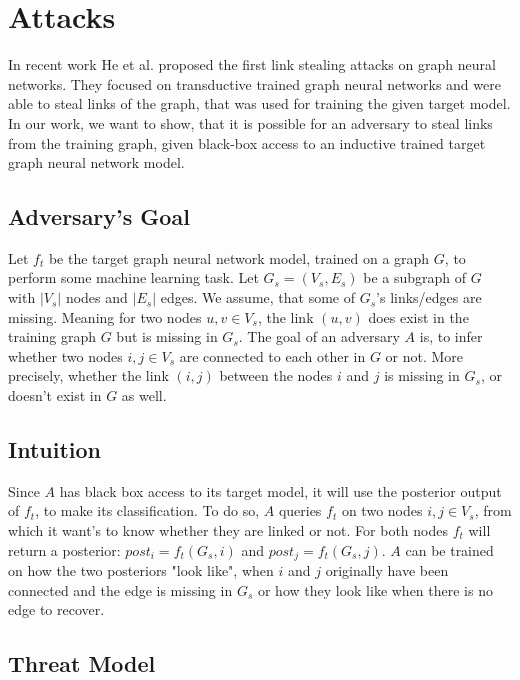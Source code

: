 \chapter{Attacks}
\label{chapter:attacks}

  In recent work He et al. \cite{DBLP:journals/corr/abs-2005-02131} proposed the first link stealing attacks on graph neural networks.
  They focused on transductive trained graph neural networks and were able to steal links of the graph, that was used for training the given target model.
  In our work, we want to show, that it is possible for an adversary to steal links from the training graph, given black-box access to an inductive trained target graph neural network model.

  \section{Adversary's Goal}

    Let $f_t$ be the target graph neural network model, trained on a graph $G$, to perform some machine learning task.
    Let $G_s = (V_s, E_s)$ be a subgraph of $G$ with $|V_s|$ nodes and $|E_s|$ edges. 
    We assume, that some of $G_s$'s links/edges are missing.
    Meaning for two nodes $u,v \in V_s$, the link $(u,v)$ does exist in the training graph $G$ but is missing in $G_s$.
    The goal of an adversary $A$ is, to infer whether two nodes $i,j \in V_s$ are connected to each other in $G$ or not.
    More precisely, whether the link $(i,j)$ between the nodes $i$ and $j$ is missing in $G_s$, or doesn't exist in $G$ as well.
  
  \section{Intuition}

    Since $A$ has black box access to its target model, it will use the posterior output of $f_t$, to make its classification.
    To do so, $A$ queries $f_t$ on two nodes $i,j \in V_s$, from which it want's to know whether they are linked or not.
    For both nodes $f_t$ will return a posterior: $post_i = f_t(G_s, i)$ and $post_j = f_t(G_s, j)$.
    $A$ can be trained on how the two posteriors "look like", when $i$ and $j$ originally have been connected and the edge is missing in $G_s$ or how they look like when there is no edge to recover.


  \section{Threat Model}
  \label{section:threat-model}

